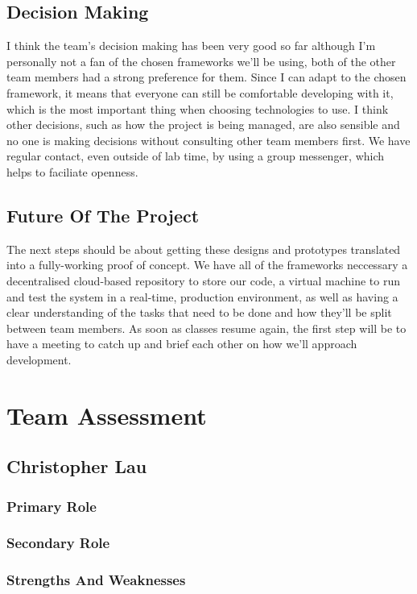 \documentclass[14pt]{report}
\begin{document}
    \subsection*{Decision Making}
    I think the team's decision making has been very good so far \textendash although I'm personally not a fan of the chosen frameworks we'll be using, both of the other team members had a strong preference for them. Since I can adapt to the chosen framework, it means that everyone can still be comfortable developing with it, which is the most important thing when choosing technologies to use. I think other decisions, such as how the project is being managed, are also sensible and no one is making decisions without consulting other team members first. We have regular contact, even outside of lab time, by using a group messenger, which helps to faciliate openness.

    \subsection*{Future Of The Project}
    The next steps should be about getting these designs and prototypes translated into a fully-working proof of concept. We have all of the frameworks neccessary \textendash a decentralised cloud-based repository to store our code, a virtual machine to run and test the system in a real-time, production environment, as well as having a clear understanding of the tasks that need to be done and how they'll be split between team members. As soon as classes resume again, the first step will be to have a meeting to catch up and brief each other on how we'll approach development.

    \section*{Team Assessment}

    \subsection*{Christopher Lau}
    \subsubsection*{Primary Role}
    \subsubsection*{Secondary Role}
    \subsubsection*{Strengths And Weaknesses}
\end{document}
